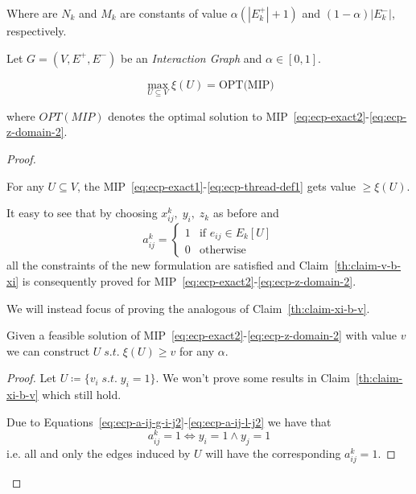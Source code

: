 Where are $N_k$ and $M_k$ are constants of value $\alpha (|E_k^{+}| + 1)$ and $(1 -
	\alpha ) |E^{-}_k|$, respectively.

\begin{theorem}
	\label{th:ecp-mip}
	Let $G = (V, E^{+}, E^{-})$ be an \emph{Interaction Graph} and $\alpha \in
		[0, 1]$.

	\begin{equation}
		\max_{U \subseteq V} \xi(U) = \text{OPT(MIP)}
	\end{equation}

	where $OPT(MIP)$ denotes the optimal solution to
	MIP~\ref{eq:ecp-exact2}-\ref{eq:ecp-z-domain-2}.
\end{theorem}
\begin{proof}
	\begin{claim}
		\label{th:claim-v-b-xi2}
		For any $U \subseteq V$, the
		MIP~\ref{eq:ecp-exact1}-\ref{eq:ecp-thread-def1} gets value $\geq \xi(U)$.
	\end{claim}

	It easy to see that by choosing $x_{ij}^{k}, \; y_i, \; z_k$ as before and
	\begin{equation*}
		a_{ij}^{k} = \begin{cases}
			1 & \text{if } e_{ij} \in E_k[U] \\
			0 & \text{otherwise}
		\end{cases}
	\end{equation*}
	all the constraints of the new formulation are satisfied and
	Claim~\ref{th:claim-v-b-xi} is consequently proved for
	MIP~\ref{eq:ecp-exact2}-\ref{eq:ecp-z-domain-2}.

	We will instead focus of proving the analogous of Claim~\ref{th:claim-xi-b-v}.
	\begin{claim}
		\label{th:claim-xi-b-v2}
		Given a feasible solution of
		MIP~\ref{eq:ecp-exact2}-\ref{eq:ecp-z-domain-2} with value $v$ we can
		construct $U \; s.t. \; \xi(U) \geq v$ for any $\alpha$.
	\end{claim}

	\begin{proof}
		Let $U \coloneqq \{ v_i \; s.t. \; y_i = 1\} $. We won't prove
		some results in Claim~\ref{th:claim-xi-b-v} which still hold.

		Due to Equations~\ref{eq:ecp-a-ij-g-i-j2}-\ref{eq:ecp-a-ij-l-j2} we
		have that
		\begin{equation}
			a_{ij}^{k} = 1 \iff y_i = 1 \land y_j = 1
		\end{equation}
		i.e. all and only the edges induced by $U$ will have the corresponding
		$a_{ij}^{k} = 1$.


\end{proof}
\end{proof}
